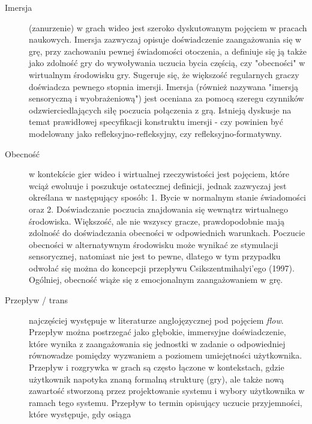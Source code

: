 \begin{description}
    \item[Imersja] (zanurzenie) w grach wideo jest szeroko dyskutowanym pojęciem w pracach
          naukowych. Imersja zazwyczaj opisuje doświadczenie zaangażowania się w grę, przy zachowaniu pewnej
          świadomości otoczenia, a definiuje się ją także jako zdolność gry do wywoływania uczucia bycia
          częścią, czy "obecności" w wirtualnym środowisku gry. Sugeruje się, że większość regularnych graczy
          doświadcza pewnego stopnia imersji\cite{development_of_game}. Imersja (również nazywana "imersją
          sensoryczną i wyobrażeniową") jest oceniana za pomocą szeregu czynników odzwierciedlających siłę
          poczucia połączenia z grą\cite{validation_of_ge_scales}.
          Istnieją dyskusje na temat prawidłowej specyfikacji konstruktu imersji - czy powinien być modelowany
          jako refleksyjno-refleksyjny, czy refleksyjno-formatywny\cite{eng_in_games}.
    \item[Obecność] w kontekście gier wideo i wirtualnej rzeczywistości jest pojęciem, które
          wciąż ewoluuje i poszukuje ostatecznej definicji, jednak zazwyczaj jest określana w następujący
          sposób: 1. Bycie w normalnym stanie świadomości oraz 2. Doświadczanie poczucia znajdowania się
          wewnątrz wirtualnego środowiska\cite{development_of_game}. Większość, ale nie wszyscy gracze, prawdopodobnie mają zdolność do
          doświadczania obecności w odpowiednich warunkach\cite{development_of_game}. Poczucie obecności w
          alternatywnym środowisku może wynikać ze stymulacji sensorycznej, natomiast nie jest to pewne,
          dlatego w tym przypadku odwołać się można do koncepcji przepływu Csikszentmihalyi'ego (1997)\cite{measuring_narrative}.
          Ogólniej, obecność wiąże się z emocjonalnym zaangażowaniem w grę\cite{validation_of_ge_scales}.
    \item[Przepływ / trans] najczęściej występuje w literaturze anglojęzycznej pod pojęciem \textit{flow}.
          Przepływ można postrzegać jako głębokie, immersyjne doświadczenie, które wynika z zaangażowania się
          jednostki w zadanie o odpowiedniej równowadze pomiędzy wyzwaniem a poziomem umiejętności użytkownika\cite{measuring_engagement}.
          Przepływ i rozgrywka w grach są często łączone w kontekstach, gdzie użytkownik napotyka znaną formalną
          strukturę (gry), ale także nową zawartość stworzoną przez projektowanie systemu i wybory użytkownika
          w ramach tego systemu\cite{measuring_engagement}. Przepływ to termin opisujący uczucie przyjemności, które występuje, gdy osiąga

\end{description}
